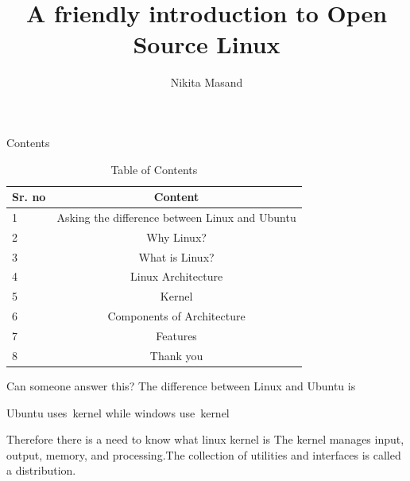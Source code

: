 \documentclass{beamer}
\title[Linux]{A friendly introduction to Open Source Linux}
\subtitle{}
\author{Nikita Masand}
\institute{\large\textbf{VJTI}}
\date{}
\begin{document}
\begin{frame}
\titlepage
\end{frame}
\begin{frame}{Contents}
\begin{table}[]
    \centering
     \caption{Table of Contents}
    \begin{tabular}{l|c|}
        Sr. no & Content \\
        \hline \hline
       1 & Asking the difference between Linux and Ubuntu \\
       2 & Why Linux? \\
       3 & What is Linux? \\
       4 & Linux Architecture\\
       5 & Kernel\\
       6 & Components of Architecture\\
       7 & Features\\
       8 & Thank you
       
    \end{tabular}
   
    \label{tab:my_label}
\end{table}
    
\end{frame}

\begin{frame}{Can someone answer this?}\vspace{10pt}
The difference between Linux and Ubuntu is 

Ubuntu uses 
\,kernel while windows use 
\,kernel \\[10pt]

\begin{block} {Therefore there is a need to know what linux kernel is}
\vspace{0.5 em}
The kernel manages input, output, memory, and processing.The collection of utilities and interfaces is called a distribution.

\end{block}
\end{frame}
\end{document}

